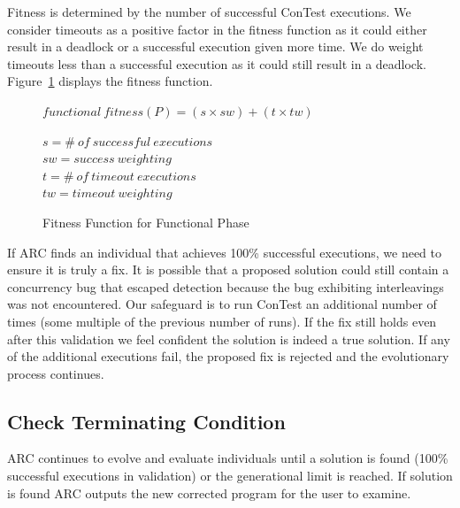 Fitness is determined by the number of successful ConTest executions. We
consider timeouts as a positive factor in the fitness function as it could
either result in a deadlock or a successful execution given more time. We do
weight timeouts less than a successful execution as it could still result in a
deadlock. Figure~\ref{fig:functional_fitness} displays the fitness function.

\begin{figure}[h]
\begin{footnotesize}
\begin{center}
$functional\ fitness(P) = (s \times sw) + (t \times tw)$
\end{center}
\end{footnotesize}
\begin{scriptsize}
\begin{center}
$s = \#\ of\ successful\ executions$ \\
$sw = success\ weighting$ \\
$t = \#\ of\ timeout\ executions$ \\
$tw = timeout\ weighting$
\end{center}
\end{scriptsize}
\caption{Fitness Function for Functional Phase}
\label{fig:functional_fitness}
\end{figure}

If ARC finds an individual that achieves 100\% successful executions, we need
to ensure it is truly a fix. It is possible that a proposed solution could
still contain a concurrency bug that escaped detection because the bug
exhibiting interleavings was not encountered. Our safeguard is to run ConTest
an additional number of times (some multiple of the previous number of runs).
If the fix still holds even after this validation we feel confident the
solution is indeed a true solution. If any of the additional executions fail,
the proposed fix is rejected and the evolutionary process continues.


\subsection{Check Terminating Condition}
\label{sec:check_terminating_condition}

ARC continues to evolve and evaluate individuals until
a solution is found (100\% successful executions in validation) or the
generational limit is reached. If solution is found ARC outputs the new
corrected program for the user to examine.

